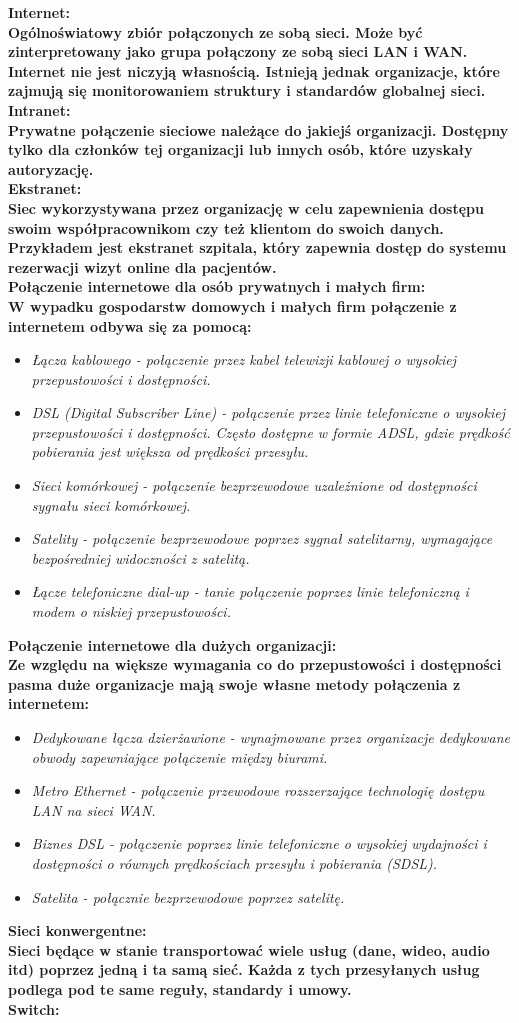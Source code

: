 \documentclass[a4paper,12pt]{article}
\newcommand{\h}[1]{\noindent \bf #1 \rm \\ \noindent}
\newcommand{\italic}[1]{\it #1 \rm}
\begin{document}
\h{Internet:}
Ogólnoświatowy zbiór połączonych ze sobą sieci. Może być zinterpretowany jako grupa połączony ze sobą sieci LAN i WAN. Internet nie jest niczyją własnością. Istnieją jednak organizacje, które zajmują się monitorowaniem struktury i standardów globalnej sieci.\\

\h{Intranet:}
Prywatne połączenie sieciowe należące do jakiejś organizacji. Dostępny tylko dla członków tej organizacji lub innych osób, które uzyskały autoryzację.\\

\h{Ekstranet:}
Siec wykorzystywana przez organizację w celu zapewnienia dostępu swoim współpracownikom czy też klientom do swoich danych. Przykładem jest ekstranet szpitala, który zapewnia dostęp do systemu rezerwacji wizyt online dla pacjentów.\\

\h{Połączenie internetowe dla osób prywatnych i małych firm:}
W wypadku gospodarstw domowych i małych firm połączenie z internetem odbywa się za pomocą:
\begin{itemize}
	\item \italic{Łącza kablowego} - połączenie przez kabel telewizji kablowej o wysokiej przepustowości i dostępności.
	\item \italic{DSL (Digital Subscriber Line)} - połączenie przez linie telefoniczne o wysokiej przepustowości i dostępności. Często dostępne w formie ADSL, gdzie prędkość pobierania jest większa od prędkości przesyłu.
	\item \italic{Sieci komórkowej} - połączenie bezprzewodowe uzależnione od dostępności sygnału sieci komórkowej.
	\item \italic{Satelity} - połączenie bezprzewodowe poprzez sygnał satelitarny, wymagające bezpośredniej widoczności z satelitą.
	\item \italic{Łącze telefoniczne dial-up} - tanie połączenie poprzez linie telefoniczną i modem o niskiej przepustowości.
\end{itemize}
\vspace{5mm}

\h{Połączenie internetowe dla dużych organizacji:}
Ze względu na większe wymagania co do przepustowości i dostępności pasma duże organizacje mają swoje własne metody połączenia z internetem:
\begin{itemize}
	\item \italic{Dedykowane łącza dzierżawione} - wynajmowane przez organizacje dedykowane obwody zapewniające połączenie między biurami.
	\item \italic{Metro Ethernet} - połączenie przewodowe rozszerzające technologię dostępu LAN na sieci WAN.
	\item \italic{Biznes DSL} - połączenie poprzez linie telefoniczne o wysokiej wydajności i dostępności o równych prędkościach przesyłu i pobierania (SDSL). 
	\item \italic{Satelita} - połącznie bezprzewodowe poprzez satelitę.
\end{itemize}
\vspace{5mm}

\h{Sieci konwergentne:}
Sieci będące w stanie transportować wiele usług (dane, wideo, audio itd) poprzez jedną i ta samą sieć. Każda z tych przesyłanych usług podlega pod te same reguły, standardy i umowy. \\

\h{Switch:}

	
\end{document}
